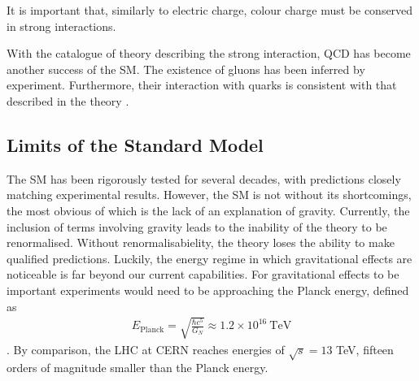 \noindent It is important that, similarly to electric charge, colour charge must be conserved in strong interactions.

With the catalogue of theory describing the strong interaction, QCD has become another success of the SM.
The existence of gluons has been inferred by experiment.
Furthermore, their interaction with quarks is consistent with that described in the theory \cite{brandelik1979evidence}.

\subsection{Limits of the Standard Model}
The SM has been rigorously tested for several decades, with predictions closely matching experimental results.
However, the SM is not without its shortcomings, the most obvious of which is the lack of an explanation of gravity.
Currently, the inclusion of terms involving gravity leads to the inability of the theory to be renormalised.
Without renormalisabielity, the theory loses the ability to make qualified predictions. 
Luckily, the energy regime in which gravitational effects are noticeable is far beyond our current capabilities.
For gravitational effects to be important experiments would need to be approaching the Planck energy, defined as
\begin{align}
E_{\textrm{Planck}} = \sqrt{\frac{\hbar c^{5}}{G_{N}}} \approx 1.2 \times 10^{16}\ \textrm{TeV}
\end{align}
\cite{ade2014astron}. 
By comparison, the LHC at CERN reaches energies of $\sqrt{s} = 13$ TeV, fifteen orders of magnitude smaller than the Planck energy.

